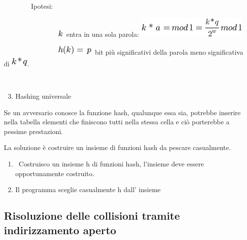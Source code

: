 \documentclass{article}
\providecommand{\tightlist}{%
  \setlength{\itemsep}{0pt}\setlength{\parskip}{0pt}}
\begin{document}
{}

{~~~~~~~~Ipotesi:}

{~~~~~~~~~~~~~~~~}\includegraphics{images/image118.png}{~entra in una
sola parola: }\includegraphics{images/image269.png}

{~~~~~~~~~~~~~~~~}\includegraphics{images/image270.png}{~bit più
significativi della parola meno significativa di
}\includegraphics{images/image271.png}{.}

{~~~~~~~~~~~~~~~~}

\begin{enumerate}
\setcounter{enumi}{2}
\tightlist
\item
  {Hashing universale}
\end{enumerate}

{}

{Se un avversario conosce la funzione hash, qualunque essa sia, potrebbe
inserire nella tabella elementi che finiscono tutti nella stessa cella e
ciò porterebbe a pessime prestazioni.}

{}

{La soluzione è costruire un insieme di funzioni hash da pescare
casualmente.}

{}

\begin{enumerate}
\tightlist
\item
  {~Costruisco un insieme h di funzioni hash, l'insieme deve essere
  opportunamente costruito.}
\item
  {Il programma sceglie casualmente h dall' insieme}
\end{enumerate}

\hypertarget{h.3fhh68cy94hw}{\subsection{\texorpdfstring{{Risoluzione
delle collisioni tramite indirizzamento
aperto}}{Risoluzione delle collisioni tramite indirizzamento aperto}}\label{h.3fhh68cy94hw}}
\end{document}
